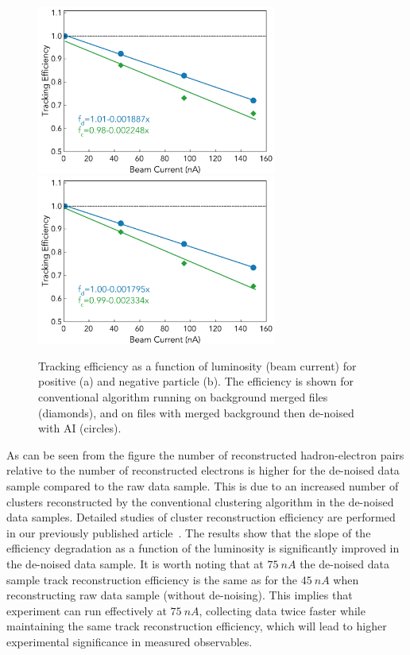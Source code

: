 \begin{figure}[!h]
\begin{center}
 \includegraphics[width=3.1in]{images/figure_lscan_pos.pdf}
 \includegraphics[width=3.1in]{images/figure_lscan_neg.pdf}
\caption {Tracking efficiency as a function of luminosity (beam current) for positive (a) and negative particle (b).  The efficiency is shown for
conventional algorithm running on background merged files (diamonds), and on files with merged background then de-noised with AI (circles).}
 \label{lscan::conv_dn}
 \end{center}
\end{figure}

As can be seen from the figure the number of reconstructed hadron-electron pairs relative to the number of reconstructed electrons is higher for the de-noised data sample compared to the raw data sample. This is due to an increased number of clusters reconstructed by the conventional clustering algorithm in the de-noised data samples. Detailed studies of cluster reconstruction efficiency are performed 
in our previously published article~\cite{Thomadakis:2022zcd}. 
The results show that the slope of the efficiency degradation as a function of the luminosity is significantly improved in the de-noised data sample. 
It is worth noting that at $75~nA$ the de-noised data sample track reconstruction efficiency is the same as for the $45~nA$ when reconstructing raw data sample (without de-noising). This implies that experiment can run effectively at $75~nA$, collecting data twice faster while maintaining the same track reconstruction efficiency, which will lead to higher experimental significance in measured observables. 

